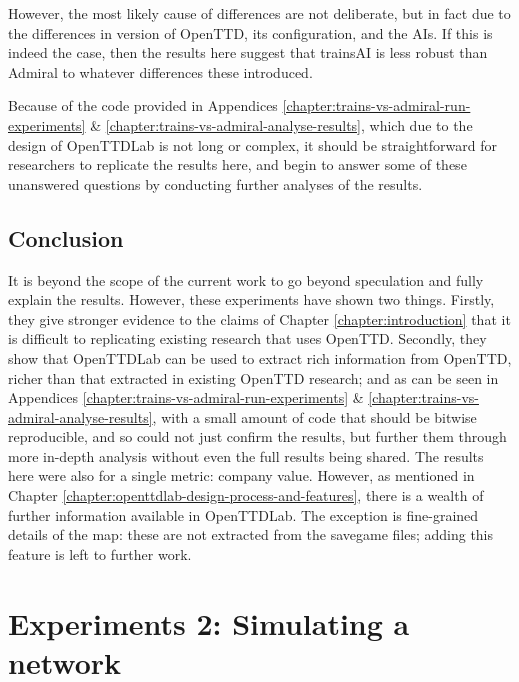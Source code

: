 \documentclass[logo,msc,dsti]{style/infthesis}    %
\begin{document}
{However, the most likely cause of differences are not deliberate, but in fact due to the differences in version of OpenTTD, its configuration, and the AIs. If this is indeed the case, then the results here suggest that trainsAI is less robust than Admiral to whatever differences these introduced.

Because of the code provided in Appendices \ref{chapter:trains-vs-admiral-run-experiments} \& \ref{chapter:trains-vs-admiral-analyse-results}, which due to the design of OpenTTDLab is not long or complex, it should be straightforward for researchers to replicate the results here, and begin to answer some of these unanswered questions by conducting further analyses of the results.

\section{Conclusion}

It is beyond the scope of the current work to go beyond speculation and fully explain the results. However, these experiments have shown two things. Firstly, they give stronger evidence to the claims of Chapter \ref{chapter:introduction} that it is difficult to replicating existing research that uses OpenTTD. Secondly, they show that OpenTTDLab can be used to extract rich information from OpenTTD, richer than that extracted in existing OpenTTD research; and as can be seen in Appendices \ref{chapter:trains-vs-admiral-run-experiments} \& \ref{chapter:trains-vs-admiral-analyse-results}, with a small amount of code that should be bitwise reproducible, and so could not just confirm the results, but further them through more in-depth analysis without even the full results being shared. The results here were also for a single metric: company value. However, as mentioned in Chapter \ref{chapter:openttdlab-design-process-and-features}, there is a wealth of further information available in OpenTTDLab. The exception is fine-grained details of the map: these are not extracted from the savegame files; adding this feature is left to further work.

\chapter{Experiments 2: Simulating a network}
\label{chapter:experiments-simple-parameterised-ai}

}
\end{document}
